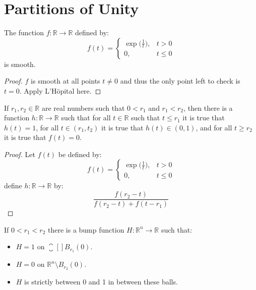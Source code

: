 \documentclass{article}                                                        %
\begin{document}
    \section{Partitions of Unity}
        \begin{theorem}
            The function $f:\mathbb{R}\rightarrow\mathbb{R}$ defined by:
            \begin{equation}
                f(t)=
                \begin{cases}
                    \exp\big(\frac{1}{t}\big),&t>0\\
                    0,&t\leq{0}
                \end{cases}
            \end{equation}
            is smooth.
        \end{theorem}
        \begin{proof}
            $f$ is smooth at all points $t\ne{0}$ and thus the only point left
            to check is $t=0$. Apply L'H\"{o}pital here.
        \end{proof}
        \begin{theorem}
            If $r_{1},r_{2}\in\mathbb{R}$ are real numbers such that
            $0<r_{1}$ and $r_{1}<r_{2}$, then there is a function
            $h:\mathbb{R}\rightarrow\mathbb{R}$ such that for all
            $t\in\mathbb{R}$ such that $t\leq{r}_{1}$ it is true that $h(t)=1$,
            for all $t\in(r_{1},t_{2})$ it is true that $h(t)\in(0,1)$, and
            for all $t\geq{r}_{2}$ it is true that $f(t)=0$.
        \end{theorem}
        \begin{proof}
            Let $f(t)$ be defined by:
            \begin{equation}
                f(t)=
                \begin{cases}
                    \exp\big(\frac{1}{t}\big),&t>0\\
                    0,&t\leq{0}
                \end{cases}
            \end{equation}
            define $h:\mathbb{R}\rightarrow\mathbb{R}$ by:
            \begin{equation}
                \frac{f(r_{2}-t)}{f(r_{2}-t)+f(t-r_{1})}
            \end{equation}
        \end{proof}
        \begin{theorem}
            If $0<r_{1}<r_{2}$ there is a bump function
            $H:\mathbb{R}^{n}\rightarrow\mathbb{R}$ such that:
            \begin{itemize}
                \item $H=1$ on $\closure[]{B_{r_{1}}(0)}$.
                \item $H=0$ on $\mathbb{R}^{n}\setminus{B}_{r_{2}}(0)$.
                \item $H$ is strictly between 0 and 1 in between these balls.
            \end{itemize}
        \end{theorem}
\end{document}
